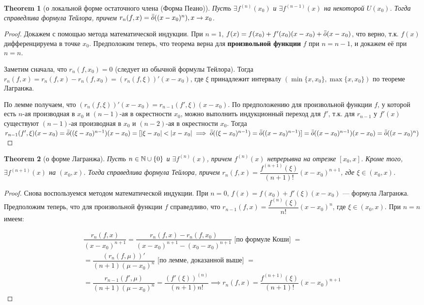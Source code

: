 \documentclass[a4paper]{article}
\theoremstyle{named}
\newtheorem*{namedtheorem}{Theorem}
\begin{document}
\begin{colloq}
		\begin{namedtheorem}[о локальной форме остаточного члена (Форма Пеано)]
			Пусть $\exists f^{(n)}(x_0)$ и $\exists f^{(n - 1)}(x)$ на некоторой $U(x_0)$. Тогда справедлива формула Тейлора, причем $r_n(f, x) = \bar{\bar{o}}((x - x_0)^n), x \to x_0$.
		\end{namedtheorem}

		\begin{proof}
			Докажем с помощью метода математической индукции. При $n = 1$, $f(x) = f(x_0) + f'(x_0)(x - x_0) + \bar{\bar{o}}(x - x_0)$, что верно, т.к. $f(x)$ дифференцируема в точке $x_0$. Предположим теперь, что теорема верна для \textbf{произвольной функции} $f$ при $n = n - 1$, и докажем её при $n = n$.

			Заметим сначала, что $r_n(f, x_0) = 0$ (следует из обычной формулы Тейлора). Тогда $r_n(f, x) = r_n(f, x) - r_n(f, x_0) = (r_n(f, \xi))'(x - x_0)$, где $\xi$ принадлежит интервалу $(\min\{x, x_0\}, \max\{x, x_0\})$ по теореме Лагранжа.

			По лемме получаем, что $(r_n(f, \xi))'(x - x_0) = r_{n - 1}(f', \xi)(x - x_0)$. По предположению для произвольной функции $f$, у которой есть $n$-ая производная в $x_0$ и $(n - 1)$-ая в окрестности $x_0$, можно выполнить индукционный переход для $f'$, т.к. для $r_{n - 1}$ у $f'(x)$ существуют $(n - 1)$-ая производная в $x_0$ и $(n - 2)$-ая в окрестности $x_0$. Тогда $r_{n - 1}(f', \xi)(x - x_0) = \bar{\bar{o}}((\xi - x_0)^{n - 1})(x - x_0) = [|\xi - x_0| < |x - x_0| \implies \bar{\bar{o}}((\xi - x_0)^{n - 1}) = \bar{\bar{o}}((x - x_0)^{n - 1})] = \bar{\bar{o}}((x - x_0)^{n - 1})(x - x_0) = \bar{\bar{o}}((x - x_0)^n)$
		\end{proof}

		\begin{namedtheorem}[о форме Лагранжа]
			Пусть $n \in \mathbb{N} \cup \{0\}$ и $\exists f^{(n)}(x)$, причем $f^{(n)}(x)$ непрерывна на отрезке $[x_0, x]$. Кроме того, $\exists f^{(n + 1)}(x)$ на $(x_0, x)$. Тогда справедлива формула Тейлора, причем $r_n(f, x) = \dfrac{f^{(n + 1)}(\xi)}{(n + 1)!}(x - x_0)^{n + 1}$, где $\xi \in (x_0, x)$.
		\end{namedtheorem}

		\begin{proof}
			Снова воспользуемся методом математической индукции. При $n = 0$, $f(x) = f(x_0) + f'(\xi)(x - x_0)$ --- формула Лагранжа. Предположим теперь, что для произвольной функции $f$ справедливо, что $r_{n - 1}(f, x) = \dfrac{f^{(n)}(\xi)}{n!}(x - x_0)^n$, где $\xi \in (x_0, x)$. При $n = n$ имеем:

			\[\begin{gathered}
				\dfrac{r_n(f, x)}{(x - x_0)^{n + 1}} = \dfrac{r_n(f, x) - r_n(f, x_0)}{(x - x_0)^{n + 1} - (x_0 - x_0)^{n + 1}} \text{ [по формуле Коши] } = \\
				= \dfrac{(r_n(f, \mu))'}{(n + 1)(\mu - x_0)^n} \text{ [по лемме, доказанной выше] } = \\
				= \dfrac{r_{n - 1}(f', \mu)}{(n + 1)(\mu - x_0)^n} = \dfrac{(f'(\xi))^{(n)}}{(n + 1)n!} \implies r_n(f, x) = \dfrac{f^{(n + 1)}(\xi)}{(n + 1)!}(x - x_0)^{n + 1}
			\end{gathered}\]
		\end{proof}


\end{colloq}
\end{document}
